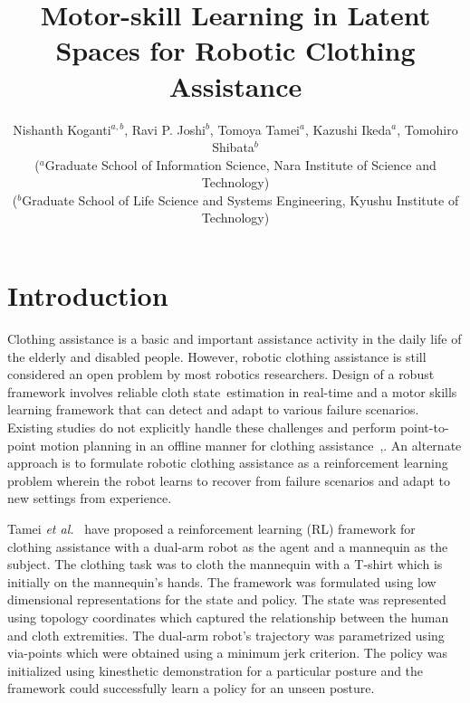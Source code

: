 \documentclass[a4paper]{article}
\begin{document}
\title{Motor-skill Learning in Latent Spaces for Robotic Clothing Assistance}
\author{Nishanth Koganti$^{a,b}$, Ravi P. Joshi$^b$, Tomoya Tamei$^a$, Kazushi Ikeda$^a$, Tomohiro Shibata$^b$\\($^a$Graduate School of Information Science, Nara Institute of Science and Technology)\\($^b$Graduate School of Life Science and Systems Engineering, Kyushu Institute of Technology)}
\engtitle{}
\engauthor{}

\maketitle
\pagestyle{empty}
\thispagestyle{empty}
\setlength{\baselineskip}{4.4mm}

\section{Introduction}
\label{section:introduction}

Clothing assistance is a basic and important assistance activity in the daily life of the elderly and disabled people. However, robotic clothing assistance is still considered an open problem by most robotics researchers. Design of a robust framework involves reliable cloth state\ estimation in real-time and a motor skills learning framework that can detect and adapt to various failure scenarios. Existing studies do not explicitly handle these challenges and perform point-to-point motion planning in an offline manner for clothing assistance~\cite{yamazaki},\cite{gao}. An alternate approach is to formulate robotic clothing assistance as a reinforcement learning problem wherein the robot learns to recover from failure scenarios and adapt to new settings from experience.

Tamei \emph{et al.}~\cite{tamei} have proposed a reinforcement learning (RL) framework for clothing assistance with a dual-arm robot as the agent and a mannequin as the subject. The clothing task was to cloth the mannequin with a T-shirt which is initially on the mannequin's hands. The framework was formulated using low dimensional representations for the state and policy. The state was represented using topology coordinates which captured the relationship between the human and cloth extremities. The dual-arm robot's trajectory was parametrized using via-points which were obtained using a minimum jerk criterion. The policy was initialized using kinesthetic demonstration for a particular posture and the framework could successfully learn a policy for an unseen posture.
\end{document}
